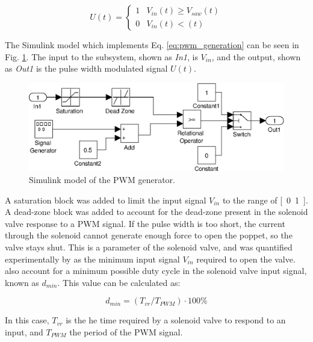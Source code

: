 \begin{equation}
\label{eq:pwm_generation}
U\left(t\right) = 
\begin{cases}
1 & V_{in}\left(t\right) \geq V_{saw}\left(t\right) \\
0 & V_{in}\left(t\right) < \left(t\right)
\end{cases}
\end{equation}

The Simulink model which implements Eq. \ref{eq:pwm_generation} can be seen in Fig. \ref{fig:pneumatics_pwm}. The input to the subsystem, shown as \emph{In1}, is $V_{in}$, and the output, shown as \emph{Out1} is the pulse width modulated signal $U(t)$. 

\begin{figure}[H]
\centering
\includegraphics[scale=0.65]{implementation/figures/pneumatic_modelling2.eps}
\caption{Simulink model of the PWM generator.}
\label{fig:pneumatics_pwm}
\end{figure}

A saturation block was added to limit the input signal $V_{in}$ to the range of \unit{[0..1]}{\volt}. A dead-zone block was added to account for the dead-zone present in the solenoid valve response to a PWM signal. If the pulse width is too short, the current through the solenoid cannot generate enough force to open the poppet, so the valve stays shut. This is a parameter of the solenoid valve, and was quantified experimentally by \cite{valve_models} as the minimum input signal $V_{in}$ required to open the valve.  also account for a minimum possible duty cycle in the solenoid valve input signal, known as $d_{min}$. This value can be calculated as:

\begin{equation}
  \label{eq:pwm_duty_min}
  d_{min}=\left(T_{vr}/T_{PWM}\right)\cdot100\%
\end{equation}

In this case, $T_{vr}$ is the he time required by a solenoid valve to respond to an input, and $T_{PWM}$ the period of the PWM signal.

